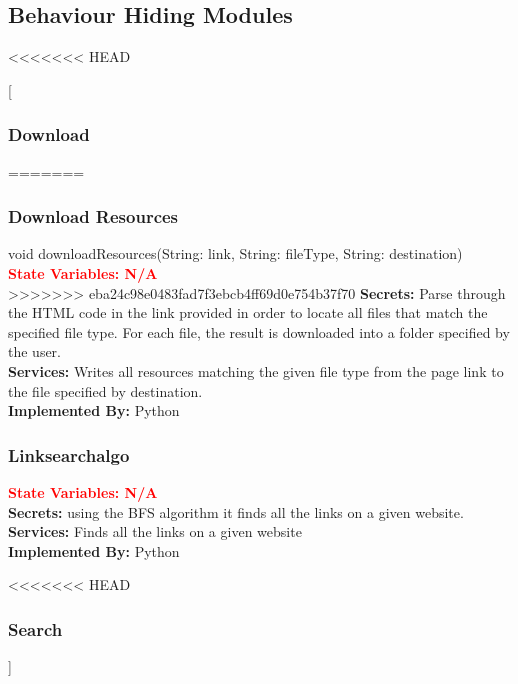 \documentclass[titlepage]{article}
\newcommand{\group}[1]{{\leavevmode\color{red}[#1]}}
\begin{document}
\subsection{Behaviour Hiding Modules}
<<<<<<< HEAD
\group{
\subsubsection{Download }


=======
\subsubsection{Download Resources}
void downloadResources(String: link, String: fileType, String: destination)\\
\textcolor{red}{\textbf{State Variables: N/A}}\\
>>>>>>> eba24c98e0483fad7f3ebcb4ff69d0e754b37f70
\textbf{Secrets:}
Parse through the HTML code in the link provided in order to locate all files that match the specified file type. For each file, the result is downloaded into a folder specified by the user.\\

\textbf{Services:}
Writes all resources matching the given file type from the page link to the file specified by destination.\\

\textbf{Implemented By:}
Python

\subsubsection{Linksearchalgo}

\textcolor{red}{\textbf{State Variables: N/A}}\\
\textbf{Secrets:}
using the BFS algorithm it finds all the links on a given website.\\

\textbf{Services:}
Finds all the links on a given website\\

\textbf{Implemented By:}
Python


<<<<<<< HEAD


\subsubsection{Search}

}
\end{document}
